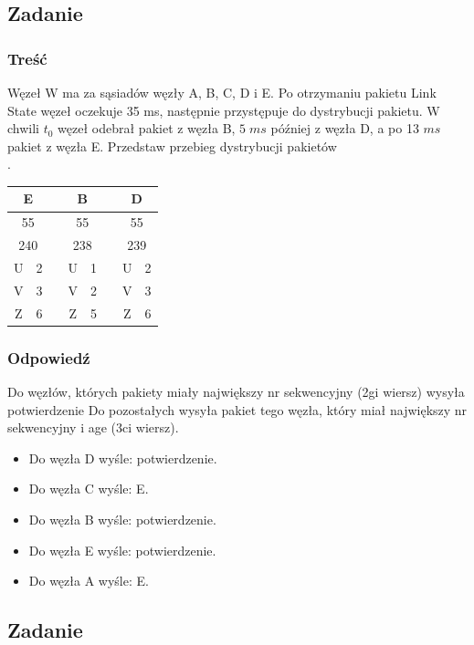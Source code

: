 	\subsection{Zadanie}
		\subsubsection{Treść}
			Węzeł W ma za sąsiadów węzły A, B, C, D i E. Po otrzymaniu pakietu Link State węzeł oczekuje 35 ms, następnie przystępuje do dystrybucji pakietu. W chwili $ t_0 $ węzeł odebrał pakiet z węzła B, $ 5\;ms $ później z węzła D, a po 13 $ ms $ pakiet z węzła E. Przedstaw przebieg dystrybucji pakietów\\.
			\begin{tabular}{|c|c|c|c|c|c|c|c|}
				\hline \multicolumn{2}{|c|}{\textbf{E}}  & & \multicolumn{2}{|c|}{\textbf{B}} & & \multicolumn{2}{|c|}{\textbf{D}}\\ 
				\hline \multicolumn{2}{|c|}{55} & &\multicolumn{2}{|c|}{55} & &\multicolumn{2}{|c|}{55} \\ 
				\hline \multicolumn{2}{|c|}{240} & &\multicolumn{2}{|c|}{238} & &\multicolumn{2}{|c|}{239}   \\ 
				\hline U & 2 & & U & 1 & & U & 2\\ 
				\hline V & 3 & & V & 2 & & V & 3\\
				\hline Z & 6 & & Z & 5 & & Z & 6\\
				\hline 
			\end{tabular}
		\subsubsection{Odpowiedź}
			Do węzłów, których pakiety miały największy nr sekwencyjny (2gi wiersz) wysyła potwierdzenie
			Do pozostałych wysyła pakiet tego węzła, który miał największy nr sekwencyjny i age (3ci wiersz).
			\begin{itemize}
				\item Do węzła D wyśle: potwierdzenie.
				\item Do węzła C wyśle: E.
				\item Do węzła B wyśle: potwierdzenie.
				\item Do węzła E wyśle: potwierdzenie.
				\item Do węzła A wyśle: E.
			\end{itemize}
	\subsection{Zadanie}
